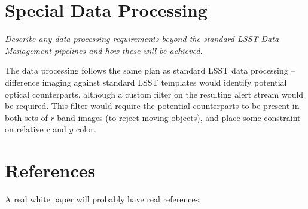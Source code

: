 \documentclass[12pt, letterpaper]{article}
\begin{document}
\section{Special Data Processing}
\begin{footnotesize}
{\it Describe any data processing requirements beyond the standard LSST Data Management pipelines and how these will be achieved.}
\end{footnotesize}

The data processing follows the same plan as standard LSST data processing -- difference imaging against standard LSST templates would identify potential optical counterparts, although a custom filter on the resulting alert stream would be required. This filter would require the potential counterparts to be present in
both sets of $r$ band images (to reject moving objects), and place some constraint on relative $r$ and $y$ color. 

\section{References}
A real white paper will probably have real references. 
\end{document}
